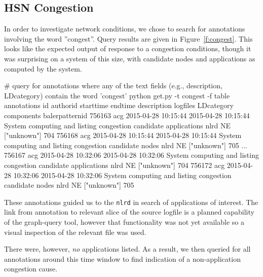 \subsection{HSN Congestion}
\label{s:congestion}

In order to investigate network conditions, we chose to search for annotations involving the
word ''congest''. Query results are given in Figure~\ref{f:congest}. This looks like the
expected output of response to a congestion conditions, though it was surprising
on a system of this size, with candidate nodes and applications
as computed by the system.

\begin{figure*}
\begin{annol}
# query for annotations where any of the text fields (e.g., description, LDcategory) contain the word 'congest'
python get.py  -t congest -f table annotations
id      authorid   starttime              endtime                description                                                      logfiles    LDcategory    components    balerpatternid
756163    acg      2015-04-28 10:15:44    2015-04-28 10:15:44    System computing and listing congestion candidate applications   nlrd    NE    ["unknown"]    704
756168    acg      2015-04-28 10:15:44    2015-04-28 10:15:44    System computing and listing congestion candidate nodes          nlrd    NE    ["unknown"]    705
...
756167    acg      2015-04-28 10:32:06    2015-04-28 10:32:06    System computing and listing congestion candidate applications   nlrd    NE    ["unknown"]    704
756172    acg      2015-04-28 10:32:06    2015-04-28 10:32:06    System computing and listing congestion candidate nodes          nlrd    NE    ["unknown"]    705
\end{annol}
\caption{Congestion response annotations occur 5 times within 15 minutes. The annotation regarding
candidate applications drove investigation of the \texttt{nlrd} log file, but no applications
were listed.}
\label{f:congest}
\end{figure*}

These annotations guided us to the \texttt{nlrd} in search of applications of interest. 
The link from annotation to relevant slice of the source logfile is a planned capability
of the graph-query tool, however that functionality was not yet available so a visual 
inspection of the relevant file was used.

There were, however, \emph{no} applications listed.
As a result, we then queried for all annotations around this time window to find indication
of a non-application congestion cause.


